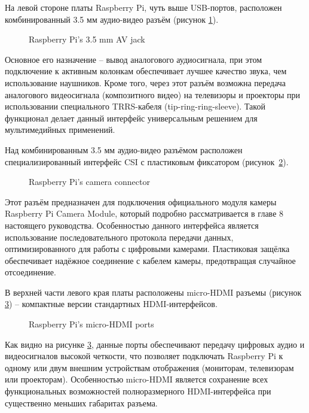 На левой стороне платы Raspberry Pi, чуть выше USB-портов, расположен комбинированный 3.5 мм аудио-видео разъём (рисунок \ref{fig:jack}).

\begin{figure}[H]
	\centering
	\caption{Raspberry Pi’s 3.5 mm AV jack}
	\label{fig:jack}
\end{figure}

Основное его назначение -- вывод аналогового аудиосигнала, при этом подключение к активным колонкам обеспечивает лучшее качество звука, чем использование наушников. Кроме того, через этот разъём возможна передача аналогового видеосигнала (композитного видео) на телевизоры и проекторы при использовании специального TRRS-кабеля (tip-ring-ring-sleeve). Такой функционал делает данный интерфейс универсальным решением для мультимедийных применений.

Над комбинированным 3.5 мм аудио-видео разъёмом расположен специализированный интерфейс CSI с пластиковым фиксатором (рисунок~\ref{fig:camera}).

\begin{figure}[H]
	\centering
	\caption{Raspberry Pi’s camera connector}
	\label{fig:camera}
\end{figure}

Этот разъём предназначен для подключения официального модуля камеры Raspberry Pi Camera Module, который подробно рассматривается в главе 8 настоящего руководства. Особенностью данного интерфейса является использование последовательного протокола передачи данных, оптимизированного для работы с цифровыми камерами. Пластиковая защёлка обеспечивает надёжное соединение с кабелем камеры, предотвращая случайное отсоединение.


В верхней части левого края платы расположены micro-HDMI разъемы (рисунок \ref{fig:microHDMI}) -- компактные версии стандартных HDMI-интерфейсов.

\begin{figure}[H]
	\centering
	\caption{Raspberry Pi’s micro-HDMI ports}
	\label{fig:microHDMI}
\end{figure}

Как видно на рисунке \ref{fig:microHDMI}, данные порты обеспечивают передачу цифровых аудио и видеосигналов высокой четкости, что позволяет подключать Raspberry Pi к одному или двум внешним устройствам отображения (мониторам, телевизорам или проекторам). Особенностью micro-HDMI является сохранение всех функциональных возможностей полноразмерного HDMI-интерфейса при существенно меньших габаритах разъема.


